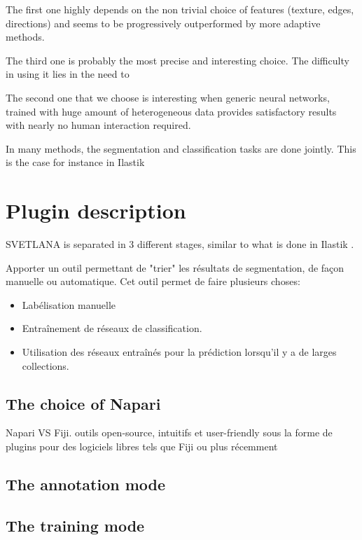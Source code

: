 \documentclass{article}
\begin{document}
The first one highly depends on the non trivial choice of features (texture, edges, directions) and seems to be progressively outperformed by more adaptive methods.

The third one is probably the most precise and interesting choice. The difficulty in using it lies in the need to 

The second one that we choose is interesting when generic neural networks, trained with huge amount of heterogeneous data provides satisfactory results with nearly no human interaction required. 

In many methods, the segmentation and classification tasks are done jointly. This is the case for instance in Ilastik \cite{berg2019ilastik}


\section{Plugin description}
\label{sec:format}

SVETLANA is separated in 3 different stages, similar to what is done in Ilastik \cite{berg2019ilastik}. 


Apporter un outil permettant de "trier" les résultats de segmentation, de façon manuelle ou automatique. 
Cet outil permet de faire plusieurs choses:
\begin{itemize}
  \item Labélisation manuelle
  \item Entraînement de réseaux de classification. 
  \item Utilisation des réseaux entraînés pour la prédiction lorsqu'il y a de larges collections.
\end{itemize}


\subsection{The choice of Napari}

Napari VS Fiji.
outils open-source, intuitifs et user-friendly sous la forme de plugins pour des logiciels libres tels que Fiji \cite{schindelin2012fiji} ou plus récemment 


\subsection{The annotation mode}

\subsection{The training mode}
\end{document}
